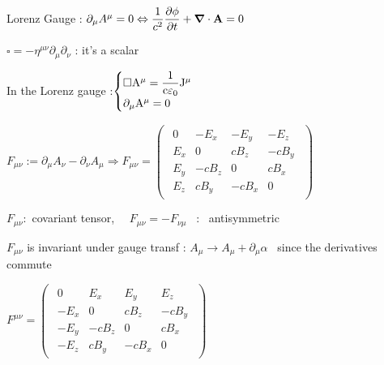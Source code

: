 \item Lorenz Gauge : $\partial_{\mu} A^{\mu} = 0 \Leftrightarrow \dfrac{1}{c^2} \dfrac{\partial \phi}{\partial t} + \vec{\nabla} \cdot \vec{\rm{A}} = 0$

\item $\square = -\eta^{\mu\nu} \partial_{\mu}\partial_{\nu}$ : it's a scalar 

\item In the Lorenz gauge :$\begin{cases}
\square \rm{A}^{\mu} = \dfrac{1}{c \varepsilon_0 }  J^{\mu}  \\
\partial_{\mu} \rm{A}^{\mu} = 0
\end{cases}$



\item $F_{\mu\nu}:=\partial_\mu A_\nu-\partial_\nu A_\mu \Rightarrow F_{\mu\nu}=\begin{pmatrix}
\begin{array}{cccc}
0 & -E_x & -E_y & -E_z \\ 
E_x & 0 & c B_z & -c B_y \\ 
E_y&-cB_z  & 0 & c B_x \\ 
E_z&  cB_y& -cB_x & 0
\end{array} 
\end{pmatrix}$

\item $F_{\mu\nu} : $ covariant tensor, $\quad F_{\mu\nu} = - F_{\nu\mu}$ \, : \, antisymmetric

\item $F_{\mu\nu}$ is invariant under gauge transf : $A_{\mu} \rightarrow A_{\mu} + \partial_{\mu}\alpha $ \, since the derivatives commute

\item $F^{\mu\nu}=\begin{pmatrix}
\begin{array}{cccc}
0 & E_x & E_y & E_z \\ 
-E_x & 0 & c B_z & -c B_y \\ 
-E_y & -cB_z  & 0 & c B_x \\ 
-E_z &  cB_y& -cB_x & 0
\end{array} 
\end{pmatrix}$

